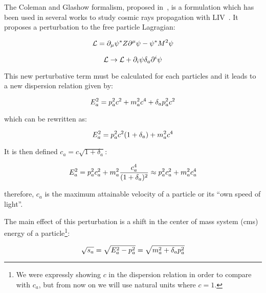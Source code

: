 \documentclass[a4paper]{jpconf}
\newcommand{\lagr}{\mathcal{L}}
\begin{document}
The Coleman and Glashow formalism, proposed in~\cite{ColemanGlashow}, is a formulation which has been used in several works to study cosmic rays propagation with LIV~\cite{Jacobson2002,Stecker2005,Maccione2009,Scully2009}. It proposes a perturbation to the free particle Lagragian:

\begin{equation}
\centering
\lagr = \partial_{\mu} \psi^{*} Z \partial^{\mu} \psi - \psi^{*} M^{2} \psi
\end{equation}

\begin{equation}
\centering
\lagr \rightarrow \lagr + \partial_{i} \psi \delta_{a} \partial^{i} \psi
\end{equation}

This new perturbative term must be calculated for each particles and it leads to a new dispersion relation given by:

\begin{equation}
\centering
E_{a}^{2} = p_{a}^{2} c^{2} + m_{a}^{2} c^{4} + \delta_{a} p_{a}^{2} c^{2}
\end{equation}

which can be rewritten as:

\begin{equation}
\centering
E_{a}^{2} = p_{a}^{2} c^{2} (1+\delta_{a}) + m_{a}^{2} c^{4}
\end{equation}

It is then defined $c_{a} = c \sqrt{1+\delta_{a}}$:

\begin{equation}
\centering
E_{a}^{2} = p_{a}^{2} c_{a}^{2} + m_{a}^{2} \frac{c_{a}^{4}}{(1+\delta_{a})^{2}} \approx p_{a}^{2} c_{a}^{2} + m_{a}^{2} c_{a}^{4}
\end{equation}

therefore, $c_{a}$ is the maximum attainable velocity of a particle or its ``own speed of light''.

The main effect of this perturbation is a shift in the center of mass system (cms) energy of a particle\footnote{We were expressly showing $c$ in the dispersion relation in order to compare with $c_{a}$, but from now on we will use natural units where $c = 1$.}:

\begin{equation}
\label{eq:DispersionRelation}
\centering
\sqrt{s_{a}} = \sqrt{E_{a}^{2} - p_{a}^{2}} = \sqrt{m_{a}^{2} + \delta_{a} p^{2}_{a}}
\end{equation}
\end{document}
